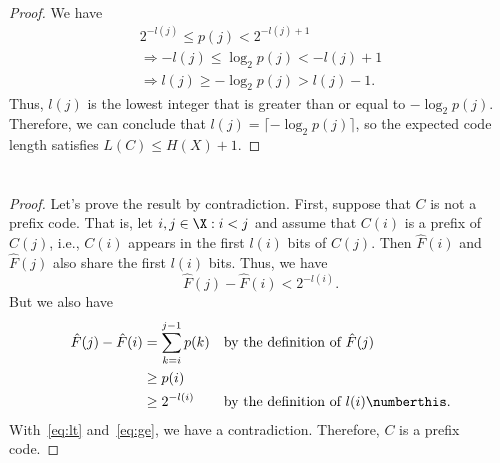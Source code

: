\documentclass[
  coursecode={MTHE 477},
  assignmentname={Homework \homeworknumber},
  studentnumber=20053722,
  name={Bryan Hoang},
  draft,
]{
  ltxanswer%
}
\begin{document}
  \begin{questions}
    \setcounter{question}{\questionnumber}
    \addtocounter{question}{-1}
    \question[20]\
    \begin{parts}
      \part{}
      \begin{solution}
        \begin{proof}
          We have
          \begin{gather*}
            2^{-l(j)} \le p(j) < 2^{-l(j) + 1} \\
            \Rightarrow -l(j) \le \log_{2} p(j) < -l(j) + 1 \\
            \Rightarrow l(j) \ge -\log_{2} p(j) > l(j) - 1.
          \end{gather*}
          Thus, \(l(j)\) is the lowest integer that is greater than or equal to \(-\log_{2} p(j)\). Therefore, we can conclude that \(l(j) = \lceil -\log_{2} p(j) \rceil\), so the expected code length satisfies \(L(C) \le H(X) + 1\).
        \end{proof}
      \end{solution}

      \part{}
      \begin{solution}
        \begin{proof}
          Let's prove the result by contradiction. First, suppose that \(C\) is not a prefix code. That is, let \(i,j\in\X:i<j\) and assume that \(C(i)\) is a prefix of \(C(j)\), i.e., \(C(i)\) appears in the first \(l(i)\) bits of \(C(j)\). Then \(\hat{F}(i)\) and \(\hat{F}(j)\) also share the first \(l(i)\) bits. Thus, we have
          \begin{equation}\label{eq:lt}
            \hat{F}(j) - \hat{F}(i) < 2^{-l(i)}.
          \end{equation}
          But we also have
          \begin{align*}
            \hat{F}(j) - \hat{F}(i) &= \sum_{k=i}^{j-1} p(k) & &\text{by the definition of \(\hat{F}(j)\)}                    \\
                                    &\ge p(i)                                                                                 \\
                                    &\ge 2^{-l(i)}           & &\text{by the definition of \(l(i)\)}\numberthis\label{eq:ge}.
          \end{align*}
          With~\eqref{eq:lt} and~\eqref{eq:ge}, we have a contradiction. Therefore, \(C\) is a prefix code.
        \end{proof}
      \end{solution}
    \end{parts}
  \end{questions}
\end{document}
